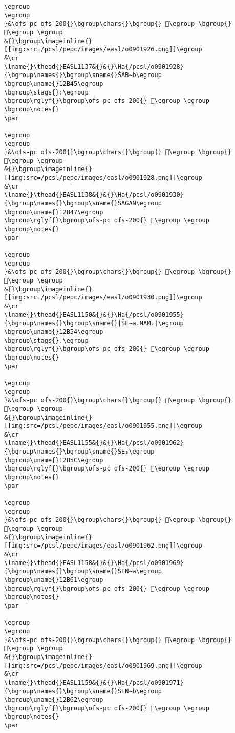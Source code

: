 \begin{verbatim}
\egroup
\egroup
}&\ofs-pc ofs-200{}\bgroup\chars{}\bgroup{} 𒭂\egroup \bgroup{} 𒭃\egroup \egroup
&{}\bgroup\imageinline{}[[img:src=/pcsl/pepc/images/easl/o0901926.png]]\egroup
&\cr
\lname{}\thead{}EASL1137&{}&{}\Ha{/pcsl/o0901928}{\bgroup\names{}\bgroup\sname{}ŠAB∼b\egroup
\bgroup\uname{}12B45\egroup
\bgroup\stags{}:\egroup
\bgroup\rglyf{}\bgroup\ofs-pc ofs-200{} 𒭅\egroup \egroup
\bgroup\notes{}
\par 

\egroup
\egroup
}&\ofs-pc ofs-200{}\bgroup\chars{}\bgroup{} 𒭄\egroup \bgroup{} 𒭅\egroup \egroup
&{}\bgroup\imageinline{}[[img:src=/pcsl/pepc/images/easl/o0901928.png]]\egroup
&\cr
\lname{}\thead{}EASL1138&{}&{}\Ha{/pcsl/o0901930}{\bgroup\names{}\bgroup\sname{}ŠAGAN\egroup
\bgroup\uname{}12B47\egroup
\bgroup\rglyf{}\bgroup\ofs-pc ofs-200{} 𒭇\egroup \egroup
\bgroup\notes{}
\par 

\egroup
\egroup
}&\ofs-pc ofs-200{}\bgroup\chars{}\bgroup{} 𒭆\egroup \bgroup{} 𒭇\egroup \egroup
&{}\bgroup\imageinline{}[[img:src=/pcsl/pepc/images/easl/o0901930.png]]\egroup
&\cr
\lname{}\thead{}EASL1150&{}&{}\Ha{/pcsl/o0901955}{\bgroup\names{}\bgroup\sname{}|ŠE∼a.NAM₂|\egroup
\bgroup\uname{}12B54\egroup
\bgroup\stags{}.\egroup
\bgroup\rglyf{}\bgroup\ofs-pc ofs-200{} 𒭔\egroup \egroup
\bgroup\notes{}
\par 

\egroup
\egroup
}&\ofs-pc ofs-200{}\bgroup\chars{}\bgroup{} 𒭔\egroup \bgroup{} 𒭕\egroup \egroup
&{}\bgroup\imageinline{}[[img:src=/pcsl/pepc/images/easl/o0901955.png]]\egroup
&\cr
\lname{}\thead{}EASL1155&{}&{}\Ha{/pcsl/o0901962}{\bgroup\names{}\bgroup\sname{}ŠE₃\egroup
\bgroup\uname{}12B5C\egroup
\bgroup\rglyf{}\bgroup\ofs-pc ofs-200{} 𒭜\egroup \egroup
\bgroup\notes{}
\par 

\egroup
\egroup
}&\ofs-pc ofs-200{}\bgroup\chars{}\bgroup{} 𒭚\egroup \bgroup{} 𒭜\egroup \egroup
&{}\bgroup\imageinline{}[[img:src=/pcsl/pepc/images/easl/o0901962.png]]\egroup
&\cr
\lname{}\thead{}EASL1158&{}&{}\Ha{/pcsl/o0901969}{\bgroup\names{}\bgroup\sname{}ŠEN∼a\egroup
\bgroup\uname{}12B61\egroup
\bgroup\rglyf{}\bgroup\ofs-pc ofs-200{} 𒭡\egroup \egroup
\bgroup\notes{}
\par 

\egroup
\egroup
}&\ofs-pc ofs-200{}\bgroup\chars{}\bgroup{} 𒭠\egroup \bgroup{} 𒭡\egroup \egroup
&{}\bgroup\imageinline{}[[img:src=/pcsl/pepc/images/easl/o0901969.png]]\egroup
&\cr
\lname{}\thead{}EASL1159&{}&{}\Ha{/pcsl/o0901971}{\bgroup\names{}\bgroup\sname{}ŠEN∼b\egroup
\bgroup\uname{}12B62\egroup
\bgroup\rglyf{}\bgroup\ofs-pc ofs-200{} 𒭢\egroup \egroup
\bgroup\notes{}
\par 


\end{verbatim}
